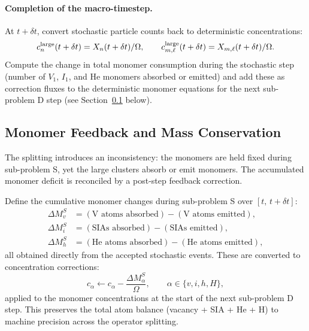 \paragraph{Completion of the macro-timestep.}
At $t + \delta t$, convert stochastic particle counts back to
deterministic concentrations:
\begin{equation}\label{eq:stoch_to_det}
    c_n^{\rm large}(t+\delta t)
    = X_n(t+\delta t) / \Omega,
    \qquad
    c_{m,\ell}^{\rm large}(t+\delta t)
    = X_{m,\ell}(t+\delta t) / \Omega.
\end{equation}
Compute the change in total monomer consumption during the stochastic
step (number of $V_1$, $I_1$, and He monomers absorbed or emitted)
and add these as correction fluxes to the deterministic monomer
equations for the next sub-problem D step (see
Section~\ref{sec:hybrid_feedback} below).

\subsection{Monomer Feedback and Mass Conservation}
\label{sec:hybrid_feedback}

The splitting introduces an inconsistency: the monomers are held
fixed during sub-problem S, yet the large clusters absorb or emit
monomers.  The accumulated monomer deficit is reconciled by a
post-step feedback correction.

Define the cumulative monomer changes during sub-problem S over
$[t,\,t+\delta t]$:
\begin{align}
    \Delta M_v^S &= (\text{V atoms absorbed}) - (\text{V atoms emitted}),
    \label{eq:DeltaMv}\\
    \Delta M_i^S &= (\text{SIAs absorbed}) - (\text{SIAs emitted}),
    \label{eq:DeltaMi}\\
    \Delta M_h^S &= (\text{He atoms absorbed}) - (\text{He atoms emitted}),
    \label{eq:DeltaMh}
\end{align}
all obtained directly from the accepted stochastic events.  These
are converted to concentration corrections:
\begin{equation}\label{eq:feedback_correction}
    c_\alpha \leftarrow c_\alpha
    - \frac{\Delta M_\alpha^S}{\Omega},
    \qquad \alpha \in \{v, i, h, H\},
\end{equation}
applied to the monomer concentrations at the start of the next
sub-problem D step.  This preserves the total atom balance
(vacancy + SIA + He + H) to machine precision across the
operator splitting.

